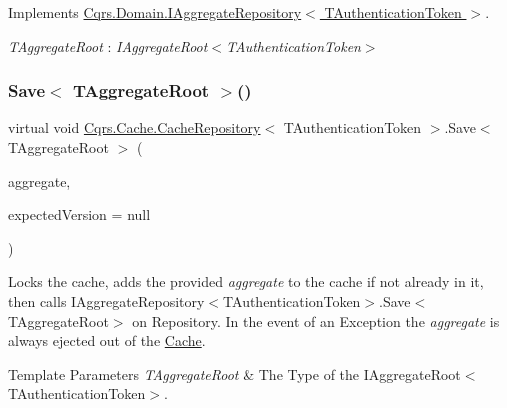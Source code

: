 Implements \hyperlink{interfaceCqrs_1_1Domain_1_1IAggregateRepository_aa0d6b4b9b117357e1676cae829fe2a5c_aa0d6b4b9b117357e1676cae829fe2a5c}{Cqrs.\+Domain.\+I\+Aggregate\+Repository$<$ T\+Authentication\+Token $>$}.

\begin{Desc}
\item[Type Constraints]\begin{description}
\item[{\em T\+Aggregate\+Root} : {\em I\+Aggregate\+Root$<$T\+Authentication\+Token$>$}]\end{description}
\end{Desc}
\mbox{\label{classCqrs_1_1Cache_1_1CacheRepository_a69df7ee1dc2e4cd38431ab987655eab3_a69df7ee1dc2e4cd38431ab987655eab3}} 
\subsubsection{\texorpdfstring{Save$<$ T\+Aggregate\+Root $>$()}{Save< TAggregateRoot >()}}
{\footnotesize\ttfamily virtual void \hyperlink{classCqrs_1_1Cache_1_1CacheRepository}{Cqrs.\+Cache.\+Cache\+Repository}$<$ T\+Authentication\+Token $>$.Save$<$ T\+Aggregate\+Root $>$ (\begin{DoxyParamCaption}\item[{T\+Aggregate\+Root}]{aggregate,  }\item[{int?}]{expected\+Version = {\ttfamily null} }\end{DoxyParamCaption})\hspace{0.3cm}{\ttfamily [virtual]}}



Locks the cache, adds the provided {\itshape aggregate}  to the cache if not already in it, then calls I\+Aggregate\+Repository$<$\+T\+Authentication\+Token$>$.\+Save$<$\+T\+Aggregate\+Root$>$ on Repository. In the event of an Exception the {\itshape aggregate}  is always ejected out of the \hyperlink{namespaceCqrs_1_1Cache}{Cache}. 


\begin{DoxyTemplParams}{Template Parameters}
{\em T\+Aggregate\+Root} & The Type of the I\+Aggregate\+Root$<$\+T\+Authentication\+Token$>$.\\
\hline
\end{DoxyTemplParams}

